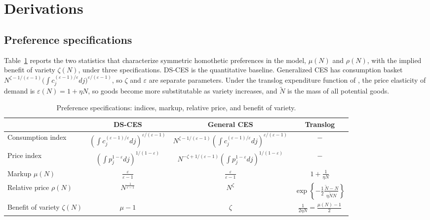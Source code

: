 \documentclass[authoryear, review, 12pt]{elsarticle}
\begin{document}
	\section{Derivations}
	\subsection{Preference specifications}\label{app:preferences}
	Table~\ref{tab:preference_specifications} reports the two statistics that characterize
	symmetric homothetic preferences in the model, $\mu(N)$ and $\rho(N)$, with the implied
	benefit of variety $\zeta(N)$, under three specifications. DS-CES is the quantitative
	baseline. Generalized CES \citep{benassy_1996} has consumption basket
	$N^{\zeta-1/(\varepsilon-1)}\bigl(\int c_j^{(\varepsilon-1)/\varepsilon}dj\bigr)^{\varepsilon/(\varepsilon-1)}$,
	so $\zeta$ and $\varepsilon$ are separate parameters. Under the translog expenditure function
	of \citet{feenstra_2003}, the price elasticity of demand is $\varepsilon(N)=1+\eta N$, so
	goods become more substitutable as variety increases, and $\tilde{N}$ is the mass of all
	potential goods.

	\begin{table}[H]
		\centering
		\begin{tabular}{l|ccc}
			\toprule
			& DS-CES & General CES & Translog \\
			\midrule
			Consumption index
			& $\left(\int c_j^{(\varepsilon-1)/\varepsilon}dj
			\right)^{\varepsilon/(\varepsilon-1)}$
			& $N^{\zeta-1/(\varepsilon-1)}\left(\int
			c_j^{(\varepsilon-1)/\varepsilon}dj
			\right)^{\varepsilon/(\varepsilon-1)}$
			& $-$ \\
			Price index
			& $\left(\int p_j^{1-\varepsilon}dj
			\right)^{1/(1-\varepsilon)}$
			& $N^{-\zeta+1/(\varepsilon-1)}\left(\int
			p_j^{1-\varepsilon}dj\right)^{1/(1-\varepsilon)}$
			& $-$ \\
			Markup $\mu(N)$
			& $\frac{\varepsilon}{\varepsilon-1}$
			& $\frac{\varepsilon}{\varepsilon-1}$
			& $1+\frac{1}{\eta N}$ \\
			Relative price $\rho(N)$
			& $N^{\frac{1}{\varepsilon-1}}$
			& $N^{\zeta}$
			& $\exp\left\{-\frac{1}{2}
			\frac{\tilde{N}-N}{\eta \tilde{N}N}\right\}$ \\
			Benefit of variety $\zeta(N)$
			& $\mu-1$
			& $\zeta$
			& $\frac{1}{2\eta N}=\frac{\mu(N)-1}{2}$ \\
			\bottomrule
		\end{tabular}
		\caption{Preference specifications: indices, markup, relative
			price, and benefit of variety.}
		\label{tab:preference_specifications}
	\end{table}
\end{document}
